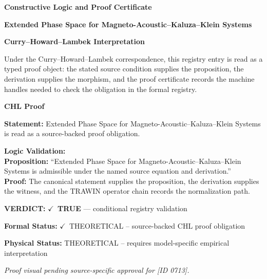 \clearpage
\begingroup\tzpsupportsetup
\noindent\textbf{\fontsize{10.8pt}{12.8pt}\selectfont [ID 0713] Constructive Logic and Proof Certificate}\par
\noindent\textbf{\fontsize{10pt}{12pt}\selectfont Extended Phase Space for Magneto-Acoustic--Kaluza--Klein Systems}\par
\vspace{0.45em}
\begingroup
\footnotesize
\setlength{\parskip}{0.22em}
\setlength{\parindent}{0pt}
\noindent\textbf{Curry--Howard--Lambek Interpretation}\par
Under the Curry--Howard--Lambek correspondence, this registry entry is read as a typed proof
object: the stated source condition supplies the proposition, the derivation supplies the
morphism, and the proof certificate records the machine handles needed to check the obligation
in the formal registry.

\vspace{0.45em}
\noindent\textbf{CHL Proof}\par
\textbf{Statement:} Extended Phase Space for Magneto-Acoustic--Kaluza--Klein Systems is read as a source-backed proof obligation.

\textbf{Logic Validation:}\\
\textbf{Proposition:} ``Extended Phase Space for Magneto-Acoustic--Kaluza--Klein Systems is admissible under the named source equation and derivation.''\\
\textbf{Proof:} The canonical statement supplies the proposition, the derivation supplies the witness, and the TRAWIN operator chain records the normalization path.

\textbf{VERDICT:} \ensuremath{\checkmark}\ \textbf{TRUE} --- conditional registry validation

\textbf{Formal Status:} \ensuremath{\checkmark}\ THEORETICAL -- source-backed CHL proof obligation

\textbf{Physical Status:} THEORETICAL -- requires model-specific empirical interpretation
\par\vspace{0.45em}
\par
\vfill
\begingroup\footnotesize\itshape
Proof visual pending source-specific approval for [ID 0713].
\par\endgroup
\vfill
\endgroup
\endgroup
